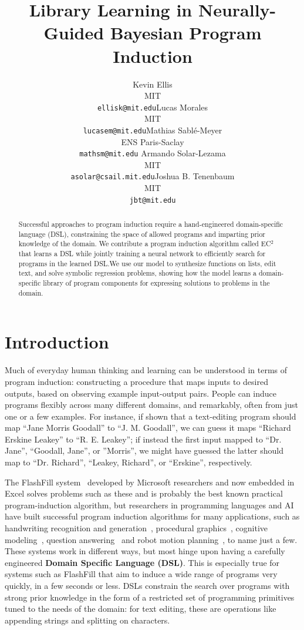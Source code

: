 \documentclass{article}
\title{Library Learning in Neurally-Guided Bayesian Program Induction}
\author{
  Kevin Ellis\\MIT\\\texttt{ellisk@mit.edu}\And Lucas Morales\\MIT\\\texttt{lucasem@mit.edu}\And Mathias Sabl\'e-Meyer\\ENS Paris-Saclay\\\texttt{mathsm@mit.edu}
  \AND
  Armando Solar-Lezama\\MIT\\\texttt{asolar@csail.mit.edu}\And Joshua B. Tenenbaum\\MIT\\\texttt{jbt@mit.edu}
}
\newcommand{\system}{\textsc{EC$^2$} }
\begin{document}

\maketitle

\begin{abstract}
  Successful approaches to program induction require a hand-engineered
  domain-specific language (DSL), constraining the space of allowed
  programs and imparting prior knowledge of the domain.  We contribute
  a program induction algorithm called \system that learns a DSL while
  jointly training a neural network to efficiently search for programs
  in the learned DSL.\@ We use our model to synthesize functions on lists,
  edit text, and solve symbolic regression problems, showing how the
  model learns a domain-specific library of program components for
  expressing solutions to problems in the domain.
\end{abstract}


\section{Introduction}

Much of everyday human thinking and learning can be understood in
terms of program induction: constructing a procedure that maps inputs
to desired outputs, based on observing example input-output pairs.
People can induce programs flexibly across many different domains, and
remarkably, often from just one or a few examples.  For instance, if
shown that a text-editing program should map ``Jane Morris Goodall''
to ``J. M. Goodall'', we can guess it maps ``Richard Erskine Leakey''
to ``R. E. Leakey''; if instead the first input mapped to
``Dr. Jane'', ``Goodall, Jane'', or ''Morris'', we might have guessed
the latter should map to ``Dr. Richard'', ``Leakey, Richard'', or
``Erskine'', respectively.

The FlashFill system~\cite{gulwani2011automating} developed by
Microsoft researchers and now embedded in Excel solves problems such
as these and is probably the best known practical program-induction
algorithm, but researchers in programming languages and AI have built
successful program induction algorithms for many applications, such as
handwriting recognition and generation~\cite{lake2015human},
procedural graphics~\cite{ellis2017learning}, cognitive
modeling~\cite{DBLP:journals/cogsr/SchmidK11}, question
answering~\cite{johnson2017clevr} and robot motion
planning~\cite{devlin2017neural}, to name just a few.  These systems
work in different ways, but most hinge upon having a carefully
engineered \textbf{Domain Specific Language (DSL)}.  This is
especially true for systems such as FlashFill that aim to induce a
wide range of programs very quickly, in a few seconds or less.  DSLs
constrain the search over programs with strong prior knowledge in the
form of a restricted set of programming primitives tuned to the needs
of the domain: for text editing, these are operations like appending
strings and splitting on characters.
\end{document}
